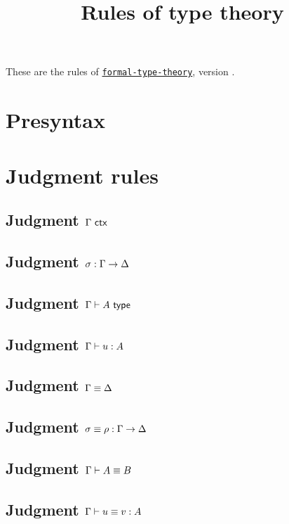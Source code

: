 \documentclass{article}
\begin{document}
\title{Rules of type theory}
\author{}
\maketitle

These are the rules of
\href{https://github.com/TheoWinterhalter/formal-type-theory}{\texttt{formal-type-theory}},
version \texttt{}.

\section{Presyntax}



\section{Judgment rules}

\subsection{Judgment $\Gamma\ \mathsf{ctx}$}

\isctxRules

\subsection{Judgment $\sigma : \Gamma \to \Delta$}

\issubstRules

\subsection{Judgment $\Gamma \vdash A \ \mathsf{type}$}

\istypeRules

\subsection{Judgment $\Gamma \vdash u : A$}

\istermRules

\subsection{Judgment $\Gamma \equiv \Delta$}

\eqctxRules

\subsection{Judgment $\sigma \equiv \rho : \Gamma \to \Delta$}

\eqsubstRules

\subsection{Judgment $\Gamma \vdash A \equiv B$}

\eqtypeRules

\subsection{Judgment $\Gamma \vdash u \equiv v : A$}

\eqtermRules
\end{document}
